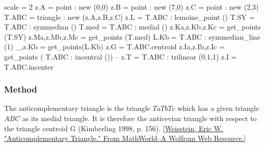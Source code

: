 \begin{minipage}{.5\textwidth}
\begin{tkzelements}
   scale          = 2
   z.A            = point :   new (0,0)
   z.B            = point :   new (7,0)
   z.C            = point :   new (2,3)
   T.ABC          = triangle : new (z.A,z.B,z.C)
   z.L            = T.ABC : lemoine_point ()
   T.SY           = T.ABC : symmedian ()
   T.med          = T.ABC : medial ()
   z.Ka,z.Kb,z.Kc = get_points (T.SY)
   z.Ma,z.Mb,z.Mc = get_points (T.med)
   L.Kb           = T.ABC : symmedian_line (1)
  _,z.Kb          = get_points(L.Kb)
  z.G             = T.ABC.centroid
  z.Ia,z.Ib,z.Ic  = get_points ( T.ABC : incentral ())
  --          z.T = T.ABC : trilinear (0,1,1)
  z.I             = T.ABC.incenter
\end{tkzelements}
\begin{center}
\end{center}


\end{minipage}


\subsubsection{Method } %
\label{ssub:method_imeth_triangle_anti}

The anticomplementary triangle is the triangle $TaTbTc$ which has a given triangle $ABC$ as its medial triangle. It is therefore the anticevian triangle with respect to the triangle centroid G (Kimberling 1998, p. 156). [\href{https://mathworld.wolfram.com/AnticomplementaryTriangle.html}{Weisstein, Eric W. "Anticomplementary Triangle." From MathWorld--A Wolfram Web Resource.}]

